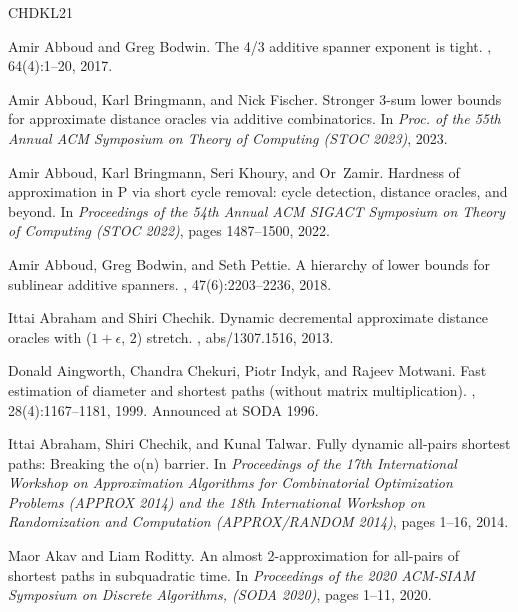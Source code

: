 \documentclass[11pt]{article}
\theoremstyle{definition}
\theoremstyle{remark}
\begin{document}

\newcommand{\etalchar}[1]{$^{#1}$}
\begin{thebibliography}{CHDKL21}

Amir Abboud and Greg Bodwin.
\newblock The 4/3 additive spanner exponent is tight.
, 64(4):1--20, 2017.

Amir Abboud, Karl Bringmann, and Nick Fischer.
\newblock Stronger 3-sum lower bounds for approximate distance oracles via
  additive combinatorics.
\newblock In {\em Proc. of the 55th Annual ACM Symposium on Theory of Computing
  ({STOC} 2023)}, 2023.

Amir Abboud, Karl Bringmann, Seri Khoury, and Or~Zamir.
\newblock Hardness of approximation in {P} via short cycle removal: cycle
  detection, distance oracles, and beyond.
\newblock In {\em Proceedings of the 54th Annual {ACM} {SIGACT} Symposium on
  Theory of Computing ({STOC} 2022)}, pages 1487--1500, 2022.

Amir Abboud, Greg Bodwin, and Seth Pettie.
\newblock A hierarchy of lower bounds for sublinear additive spanners.
, 47(6):2203--2236, 2018.

Ittai Abraham and Shiri Chechik.
\newblock Dynamic decremental approximate distance oracles with ($1+\epsilon$,
  $2$) stretch.
, abs/1307.1516, 2013.

Donald Aingworth, Chandra Chekuri, Piotr Indyk, and Rajeev Motwani.
\newblock Fast estimation of diameter and shortest paths (without matrix
  multiplication).
, 28(4):1167--1181, 1999.
\newblock Announced at {SODA} 1996.

Ittai Abraham, Shiri Chechik, and Kunal Talwar.
\newblock Fully dynamic all-pairs shortest paths: Breaking the o(n) barrier.
\newblock In {\em Proceedings of the 17th International Workshop on
  Approximation Algorithms for Combinatorial Optimization Problems (APPROX
  2014) and the 18th International Workshop on Randomization and Computation
  ({APPROX/RANDOM} 2014)}, pages 1--16, 2014.

Maor Akav and Liam Roditty.
\newblock An almost 2-approximation for all-pairs of shortest paths in
  subquadratic time.
\newblock In {\em Proceedings of the 2020 {ACM-SIAM} Symposium on Discrete
  Algorithms, ({SODA} 2020)}, pages 1--11, 2020.


\end{thebibliography}
\end{document}
